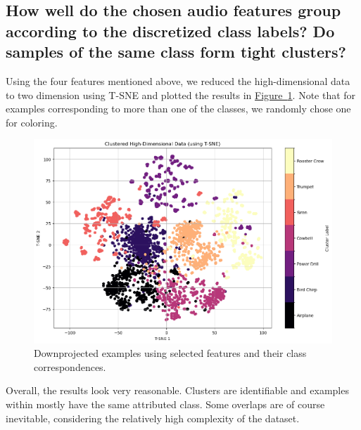 \subsection{How well do the chosen audio features group according to the discretized class labels? Do samples of the same class form tight clusters?}
\label{sec:Labeling Function:c}
Using the four features mentioned above, we reduced the high-dimensional data to two dimension using T-SNE and plotted the results in \hyperref[fig:1_TSNE]{Figure~\ref*{fig:1_TSNE}}. Note that for examples corresponding to more than one of the classes, we randomly chose one for coloring.

\begin{figure}[htbp]
    \centering
    \includegraphics[width=0.5\linewidth]{figs/1_TSNE.png}
    \caption{Downprojected examples using selected features and their class correspondences.}
    \label{fig:1_TSNE}
\end{figure}

Overall, the results look very reasonable. Clusters are identifiable and examples within mostly have the same attributed class. Some overlaps are of course inevitable, considering the relatively high complexity of the dataset. 